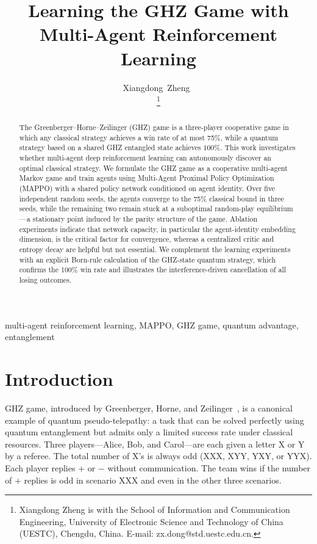 \documentclass[journal]{IEEEtran}
\begin{document}
\title{Learning the GHZ Game with Multi-Agent Reinforcement Learning}

\author{Xiangdong~Zheng~\IEEEmembership{ }

\thanks{Xiangdong Zheng is with the School of Information and Communication
        Engineering, University of Electronic Science and Technology of China
        (UESTC), Chengdu, China. E-mail: zx.dong@std.uestc.edu.cn.}
}

\maketitle

\begin{abstract}
The Greenberger--Horne--Zeilinger (GHZ) game is a three-player cooperative game in which any classical strategy achieves a win rate of at most 75\%, while a quantum strategy based on a shared GHZ entangled state achieves 100\%. This work investigates whether multi-agent deep reinforcement learning can autonomously discover an optimal classical strategy. We formulate the GHZ game as a cooperative multi-agent Markov game and train agents using Multi-Agent Proximal Policy Optimization (MAPPO) with a shared policy network conditioned on agent identity. Over five independent random seeds, the agents converge to the 75\% classical bound in three seeds, while the remaining two remain stuck at a suboptimal random-play equilibrium---a stationary point induced by the parity structure of the game. Ablation experiments indicate that network capacity, in particular the agent-identity embedding dimension, is the critical factor for convergence, whereas a centralized critic and entropy decay are helpful but not essential. We complement the learning experiments with an explicit Born-rule calculation of the GHZ-state quantum strategy, which confirms the 100\% win rate and illustrates the interference-driven cancellation of all losing outcomes.
\end{abstract}

\begin{IEEEkeywords}
multi-agent reinforcement learning, MAPPO, GHZ game, quantum advantage, entanglement
\end{IEEEkeywords}

\section{Introduction}

 GHZ game, introduced by Greenberger, Horne, and Zeilinger~\cite{ghz1989}, is a canonical example of quantum pseudo-telepathy: a task that can be solved perfectly using quantum entanglement but admits only a limited success rate under classical resources. Three players---Alice, Bob, and Carol---are each given a letter X or Y by a referee. The total number of X's is always odd (XXX, XYY, YXY, or YYX). Each player replies $+$ or $-$ without communication. The team wins if the number of $+$ replies is odd in scenario XXX and even in the other three scenarios.
\end{document}
